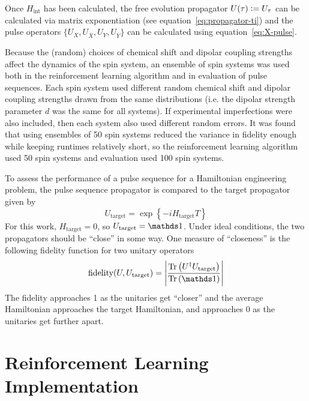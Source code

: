 
Once $H_{\text{int}}$ has been calculated, the free evolution propagator $U(\tau) \mathrel{\mathop:}= U_\tau$ can be calculated via matrix exponentiation (see equation~\ref{eq:propagator-ti})
and
the pulse operators $\{ U_X, U_{\overline{X}}, U_Y, U_{\overline{Y}} \}$ can be calculated using equation~\ref{eq:X-pulse}.

Because the (random) choices of chemical shift and dipolar coupling strengths affect the dynamics of the spin system, an ensemble of spin systems was used both in the reinforcement learning algorithm and in evaluation of pulse sequences.
Each spin system used different random chemical shift and dipolar coupling strengths drawn from the same distributions (i.e. the dipolar strength parameter $d$ was the same for all systems). If experimental imperfections were also included, then each system also used different random errors.
It was found that using ensembles of 50 spin systems reduced the variance in fidelity enough while keeping runtimes relatively short, so
the reinforcement learning algorithm used 50 spin systems and evaluation used 100 spin systems.

To assess the performance of a pulse sequence for a Hamiltonian engineering problem, the pulse sequence propagator is compared to the target propagator given by
\begin{equation}
    U_{\text{target}} = \exp\left\{ -i H_{\text{target}} T \right\}
\end{equation}
For this work, $H_{\text{target}} = 0$, so $U_{\text{target}} = \identity$.
Under ideal conditions, the two propagators should be ``close'' in some way. One measure of ``closeness'' is the following fidelity function for two unitary operators
\begin{equation}
    \text{fidelity}(U, U_\text{target}) = \left| \frac{\Tr{
        U^\dagger U_\text{target}
    }}{\Tr{\identity}} \right|
\end{equation}
The fidelity approaches 1 as the unitaries get ``closer'' and the average Hamiltonian approaches the target Hamiltonian, and approaches 0 as the unitaries get further apart.

\section{Reinforcement Learning Implementation}\label{sec:methods-RL}

